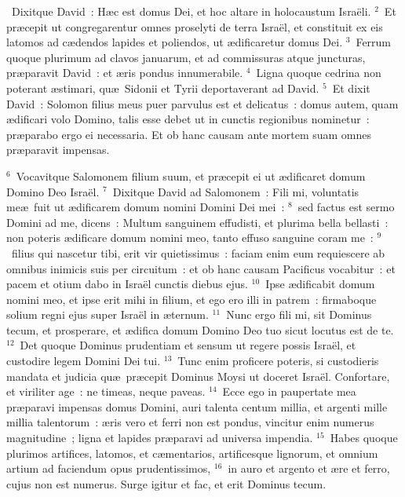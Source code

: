 ~\lettrine[lines=10,image=true,loversize=0.05,lraise=-0.03]{D}{}ixitque David~: H\ae c est domus Dei, et hoc altare in holocaustum Isra\"eli.
${}^{2}$~Et pr\ae cepit ut congregarentur omnes proselyti de terra Isra\"el, et constituit ex eis latomos ad c\ae dendos lapides et poliendos, ut \ae dificaretur domus Dei.
${}^{3}$~Ferrum quoque plurimum ad clavos januarum, et ad commissuras atque juncturas, pr\ae paravit David~: et \ae ris pondus innumerabile.
${}^{4}$~Ligna quoque cedrina non poterant \ae stimari, qu\ae\ Sidonii et Tyrii deportaverant ad David.
${}^{5}$~Et dixit David~: Solomon filius meus puer parvulus est et delicatus~: domus autem, quam \ae dificari volo Domino, talis esse debet ut in cunctis regionibus nominetur~: pr\ae parabo ergo ei necessaria. Et ob hanc causam ante mortem suam omnes pr\ae paravit impensas.


${}^{6}$~Vocavitque Salomonem filium suum, et pr\ae cepit ei ut \ae dificaret domum Domino Deo Isra\"el.
${}^{7}$~Dixitque David ad Salomonem~: Fili mi, voluntatis me\ae\ fuit ut \ae dificarem domum nomini Domini Dei mei~:
${}^{8}$~sed factus est sermo Domini ad me, dicens~: Multum sanguinem effudisti, et plurima bella bellasti~: non poteris \ae dificare domum nomini meo, tanto effuso sanguine coram me~:
${}^{9}$~filius qui nascetur tibi, erit vir quietissimus~: faciam enim eum requiescere ab omnibus inimicis suis per circuitum~: et ob hanc causam Pacificus vocabitur~: et pacem et otium dabo in Isra\"el cunctis diebus ejus.
${}^{10}$~Ipse \ae dificabit domum nomini meo, et ipse erit mihi in filium, et ego ero illi in patrem~: firmaboque solium regni ejus super Isra\"el in \ae ternum.
${}^{11}$~Nunc ergo fili mi, sit Dominus tecum, et prosperare, et \ae difica domum Domino Deo tuo sicut locutus est de te.
${}^{12}$~Det quoque Dominus prudentiam et sensum ut regere possis Isra\"el, et custodire legem Domini Dei tui.
${}^{13}$~Tunc enim proficere poteris, si custodieris mandata et judicia qu\ae\ pr\ae cepit Dominus Moysi ut doceret Isra\"el. Confortare, et viriliter age~: ne timeas, neque paveas.
${}^{14}$~Ecce ego in paupertate mea pr\ae paravi impensas domus Domini, auri talenta centum millia, et argenti mille millia talentorum~: \ae ris vero et ferri non est pondus, vincitur enim numerus magnitudine~; ligna et lapides pr\ae paravi ad universa impendia.
${}^{15}$~Habes quoque plurimos artifices, latomos, et c\ae mentarios, artificesque lignorum, et omnium artium ad faciendum opus prudentissimos,
${}^{16}$~in auro et argento et \ae re et ferro, cujus non est numerus. Surge igitur et fac, et erit Dominus tecum.


